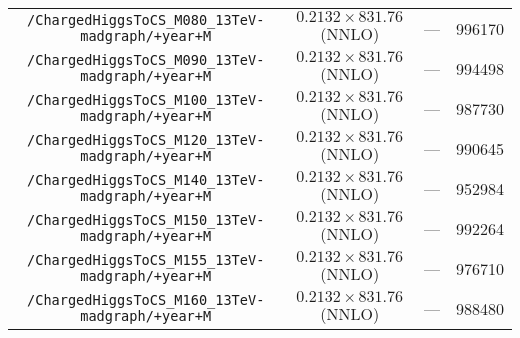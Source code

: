 \begin{adjustbox}{max width=\textwidth}
\begin{tabular}{cccc}
 \verb|/ChargedHiggsToCS_M080_13TeV-madgraph/+year+M|  & $0.2132 \times 831.76$(NNLO) & --- &996170   \\[0.1cm]
 \verb|/ChargedHiggsToCS_M090_13TeV-madgraph/+year+M|  & $0.2132 \times 831.76$(NNLO) & --- &994498   \\[0.1cm]
 \verb|/ChargedHiggsToCS_M100_13TeV-madgraph/+year+M|  & $0.2132 \times 831.76$(NNLO) & --- &987730   \\[0.1cm]
 \verb|/ChargedHiggsToCS_M120_13TeV-madgraph/+year+M|  & $0.2132 \times 831.76$(NNLO) & --- &990645   \\[0.1cm]
 \verb|/ChargedHiggsToCS_M140_13TeV-madgraph/+year+M|  & $0.2132 \times 831.76$(NNLO) & --- &952984   \\[0.1cm]
 \verb|/ChargedHiggsToCS_M150_13TeV-madgraph/+year+M|  & $0.2132 \times 831.76$(NNLO) & --- &992264   \\[0.1cm]
 \verb|/ChargedHiggsToCS_M155_13TeV-madgraph/+year+M|  & $0.2132 \times 831.76$(NNLO) & --- &976710   \\[0.1cm]
 \verb|/ChargedHiggsToCS_M160_13TeV-madgraph/+year+M|  & $0.2132 \times 831.76$(NNLO) & --- &988480
    \\[0.1cm]\hline
\end{tabular}
\end{adjustbox}
